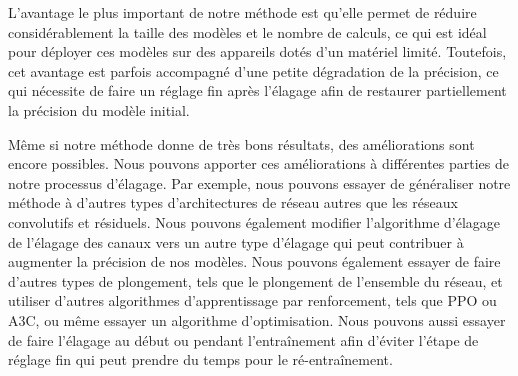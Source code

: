L'avantage le plus important de notre méthode est qu'elle permet de réduire considérablement la taille des modèles et le nombre de calculs, ce qui est idéal pour déployer ces modèles sur des appareils dotés d'un matériel limité. Toutefois, cet avantage est parfois accompagné d'une petite dégradation de la précision, ce qui nécessite de faire un réglage fin après l'élagage afin de restaurer partiellement la précision du modèle initial.

Même si notre méthode donne de très bons résultats, des améliorations sont encore possibles. Nous pouvons apporter ces améliorations à différentes parties de notre processus d’élagage. Par exemple, nous pouvons essayer de généraliser notre méthode à d'autres types d’architectures de réseau autres que les réseaux convolutifs et résiduels. Nous pouvons également modifier l'algorithme d'élagage de l'élagage des canaux vers un autre type d'élagage qui peut contribuer à augmenter la précision de nos modèles. Nous pouvons également essayer de faire d'autres types de plongement, tels que le plongement de l'ensemble du réseau, et utiliser d'autres algorithmes d'apprentissage par renforcement, tels que PPO ou A3C, ou même essayer un algorithme d'optimisation. Nous pouvons aussi essayer de faire l'élagage au début ou pendant l'entraînement afin d'éviter l'étape de réglage fin qui peut prendre du temps pour le ré-entraînement.